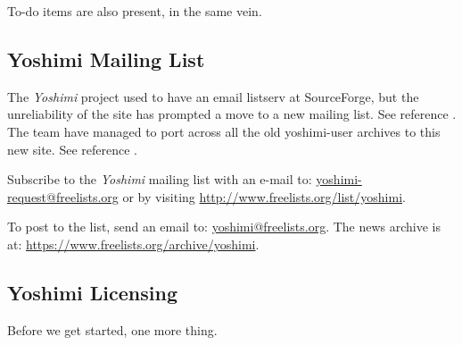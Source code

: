 \documentclass[
 11pt,
 twoside,
 a4paper,
 final                                 %
]{article}
\begin{document}
   To-do items are also present, in the same vein.

\subsection{Yoshimi Mailing List}
\label{subsec:introduction_mailing_list}

   The \textsl{Yoshimi} project used to have an email listserv at
   SourceForge, but the unreliability of the site has prompted a move to a
   new mailing list.  See reference \cite{yoshiminews}.  The team have
   managed to port across all the old yoshimi-user archives to this new
   site.  See reference \cite{yoshiminewsarchive}.

   Subscribe to the \textsl{Yoshimi} mailing list with an e-mail to:
   \url{yoshimi-request@freelists.org} or by visiting
   \url{http://www.freelists.org/list/yoshimi}.

   To post to the list, send an email to: \url{yoshimi@freelists.org}.
   The news archive is at: \url{https://www.freelists.org/archive/yoshimi}.

\subsection{Yoshimi Licensing}
\label{subsec:introduction_yoshimi_licensing}

   Before we get started, one more thing.
\end{document}
